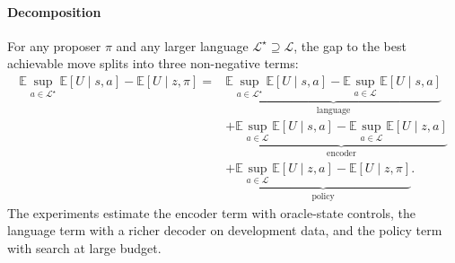 \paragraph{Decomposition} For any proposer $\pi$ and any larger language
$\mathcal L^\star\supseteq\mathcal L$, the gap to the best achievable move splits into three
non-negative terms:
\begin{align*}
\mathbb E\sup_{a\in\mathcal L^\star}\mathbb E[U\mid s,a]-\mathbb E[U\mid z,\pi]
={}&\underbrace{\mathbb E\sup_{a\in\mathcal L^\star}\mathbb E[U\mid s,a]-\mathbb E\sup_{a\in\mathcal L}\mathbb E[U\mid s,a]}_{\text{language}}\\
&+\underbrace{\mathbb E\sup_{a\in\mathcal L}\mathbb E[U\mid s,a]-\mathbb E\sup_{a\in\mathcal L}\mathbb E[U\mid z,a]}_{\text{encoder}}\\
&+\underbrace{\mathbb E\sup_{a\in\mathcal L}\mathbb E[U\mid z,a]-\mathbb E[U\mid z,\pi]}_{\text{policy}}.
\end{align*}
The
experiments estimate the encoder term with oracle-state controls, the language term with a richer
decoder on development data, and the policy term with search at large budget.
